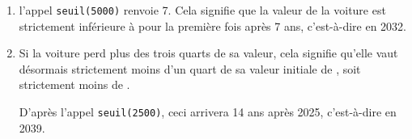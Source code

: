 \begin{enumerate}
	On obtient ainsi le programme :

\begin{lstlisting}[style=python,numbers=none,xleftmargin=5cm,xrightmargin=5cm]
def seuil(A) :
	N = 0
	U = 10000
	while U >= A :
		U = 0.9*U
		N = N+1
	return N
\end{lstlisting}

	\item l'appel \texttt{seuil(5000)} renvoie 7. Cela signifie que la valeur de la voiture est strictement inférieure à  pour la première fois après 7 ans, c'est-à-dire en 2032.

	\item Si la voiture perd plus des trois quarts de sa valeur, cela signifie qu'elle vaut désormais strictement moins d'un quart de sa valeur initiale de , soit strictement moins de .

	D'après l'appel \texttt{seuil(2500)}, ceci arrivera 14 ans après 2025, c'est-à-dire en 2039.
\end{enumerate}

